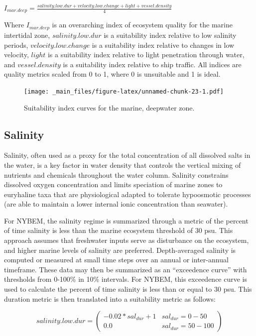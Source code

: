 \documentclass[
]{book}
\begin{document}
\(I_{mar.deep} = \frac{salinity.low.dur + velocity.low.change + light + vessel.density}{4}\)

Where \(I_{mar.deep}\) is an overarching index of ecosystem quality for the marine intertidal zone, \(salinity.low.dur\) is a suitability index relative to low salinity periods, \(velocity.low.change\) is a suitability index relative to changes in low velocity, \(light\) is a suitability index relative to light penetration through water, and \(vessel.density\) is a suitability index relative to ship traffic. All indices are quality metrics scaled from 0 to 1, where 0 is unsuitable and 1 is ideal.

\begin{figure}
\centering
\texttt{[image: \_main\_files/figure-latex/unnamed-chunk-23-1.pdf]}
\caption{\label{fig:unnamed-chunk-23}Suitability index curves for the marine, deepwater zone.}
\end{figure}

\hypertarget{salinity-1}{%
\subsection{Salinity}\label{salinity-1}}

Salinity, often used as a proxy for the total concentration of all dissolved salts in the water, is a key factor in water density that controls the vertical mixing of nutrients and chemicals throughout the water column. Salinity constrains dissolved oxygen concentration and limits speciation of marine zones to euryhaline taxa that are physiological adapted to tolerate hypoosmotic processes (are able to maintain a lower internal ionic concentration than seawater).

For NYBEM, the salinity regime is summarized through a metric of the percent of time salinity is less than the marine ecosystem threshold of 30 psu. This approach assumes that freshwater inputs serve as disturbance on the ecosystem, and higher marine levels of salinity are preferred. Depth-averaged salinity is computed or measured at small time steps over an annual or inter-annual timeframe. These data may then be summarized as an ``exceedence curve'' with thresholds from 0-100\% in 10\% intervals. For NYBEM, this exceedence curve is used to calculate the percent of time salinity is less than or equal to 30 psu. This duration metric is then translated into a suitability metric as follows:

\[salinity.low.dur = \begin{pmatrix} -0.02*sal_{dur}+1 & sal_{dur}=0-50\\
0.0 & sal_{dur}=50-100
\end{pmatrix}\]
\end{document}
